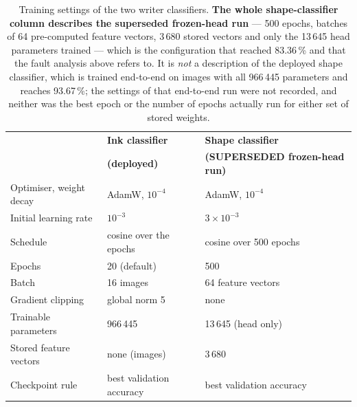 \begin{table}[h]
\centering
\fontsize{9.5}{11.5}\selectfont
\begin{tabular}{|l|l|l|}
\hline
& \textbf{Ink classifier} & \textbf{Shape classifier} \\
& \textbf{(deployed)} & \textbf{(SUPERSEDED frozen-head run)} \\
\hline
Optimiser, weight decay & AdamW, $10^{-4}$ & AdamW, $10^{-4}$ \\
Initial learning rate & $10^{-3}$ & $3\times10^{-3}$ \\
Schedule & cosine over the epochs & cosine over 500 epochs \\
Epochs & 20 (default) & 500 \\
Batch & 16 images & 64 feature vectors \\
Gradient clipping & global norm 5 & none \\
Trainable parameters & 966\,445 & 13\,645 (head only) \\
Stored feature vectors & none (images) & 3\,680 \\
Checkpoint rule & best validation accuracy & best validation accuracy \\
\hline
\end{tabular}
\caption{Training settings of the two writer classifiers. \textbf{The whole shape-classifier column describes the superseded frozen-head run} --- 500 epochs, batches of 64 pre-computed feature vectors, 3\,680 stored vectors and only the 13\,645 head parameters trained --- which is the configuration that reached 83.36\,\% and that the fault analysis above refers to. It is \emph{not} a description of the deployed shape classifier, which is trained end-to-end on images with all 966\,445 parameters and reaches 93.67\,\%; the settings of that end-to-end run were not recorded, and neither was the best epoch or the number of epochs actually run for either set of stored weights.}
\label{tab:wid-hyper}
\end{table}

